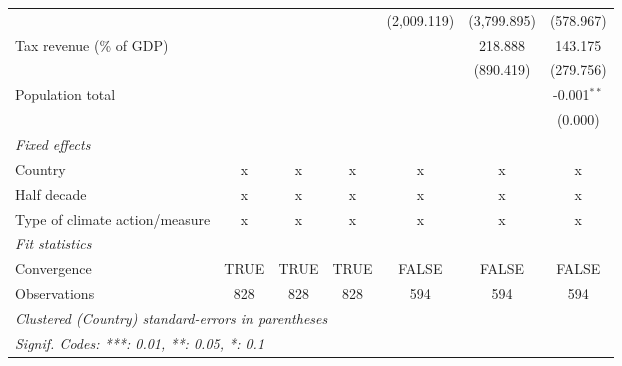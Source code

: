 \begin{tabular}{lcccccc}
                                                      &         &                &                & (2,009.119)       & (3,799.895)    & (578.967)\\   
   Tax revenue (\% of GDP)                            &         &                &                &                   & 218.888        & 143.175\\   
                                                      &         &                &                &                   & (890.419)      & (279.756)\\   
   Population total                                   &         &                &                &                   &                & -0.001$^{**}$\\   
                                                      &         &                &                &                   &                & (0.000)\\   
   \emph{Fixed effects}\\
   Country                                            & x       & x              & x              & x                 & x              & x\\  
   Half decade                                        & x       & x              & x              & x                 & x              & x\\  
   Type of climate action/measure                     & x       & x              & x              & x                 & x              & x\\  
   \midrule \emph{Fit statistics}\\
   Convergence                                        &TRUE     & TRUE           & TRUE           & FALSE             & FALSE          & FALSE\\  
   Observations                                       & 828     & 828            & 828            & 594               & 594            & 594\\  
   \midrule
   \multicolumn{7}{l}{\emph{Clustered (Country) standard-errors in parentheses}}\\
   \multicolumn{7}{l}{\emph{Signif. Codes: ***: 0.01, **: 0.05, *: 0.1}}\\
\end{tabular}
\par\endgroup


